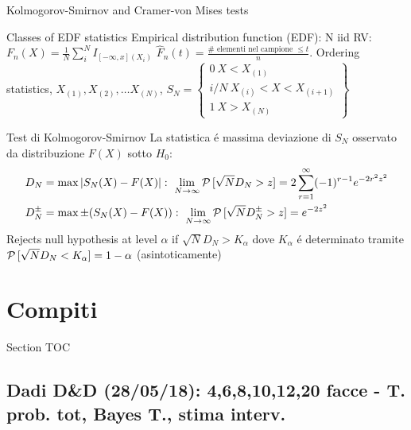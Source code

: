 \documentclass[asd-beamer.tex]{subfiles}
\begin{document}
\begin{frame}{Kolmogorov-Smirnov and Cramer-von Mises tests}
\begin{block}{Classes of EDF statistics}
	Empirical distribution function (EDF): N iid RV: $F_n(X)=\frac{1}{N}\sum_i^NI_{[-\infty,x](X_i)}$ $\hat{F}_n(t)=\frac{\#\text{ elementi nel campione }\leq t}{n}$.
 Ordering statistics, $X_{(1)}, X_{(2)}, \ldots X_{(N)}$, $S_N=\left\{\begin{array}{c}0\ X<X_{(1)}\\i/N\ X_{(i)}<X<X_{(i+1)}\\1\ X>X_{(N)}\end{array}\right\}$
\end{block}

\begin{block}{Test di Kolmogorov-Smirnov }
La statistica \'e massima deviazione di $S_N$ osservato da distribuzione $F(X)$ sotto $H_0$:
\begin{align*}
&D_N=\max|S_N(X)-F(X)|:\ \lim_{N\to\infty}\prob{[\sqrt{N}D_N>z]}=2\sum_{r=1}^{\infty}(-1)\expy{r-1}\exp{-2r^2z^2}\\
&D_N^{\pm}=\max\pm(S_N(X)-F(X)):\ \lim_{N\to\infty}\prob{[\sqrt{N}D_N^{\pm}>z]}=\exp{-2z^2}
\end{align*}
Rejects null hypothesis at level $\alpha$ if $\sqrt{N}D_N>K_{\alpha}$ dove $K_{\alpha}$ \'e determinato tramite $\operatorname{\mathcal{P}}{[\sqrt{N}D_N<K_{\alpha}]}=1-\alpha$ (asintoticamente)
\end{block}
\end{frame}


\section{Compiti}

\begin{frame}[allowframebreaks]{Section TOC}
\tableofcontents[currentsection,sectionstyle=show/hide,subsectionstyle=show/show/hide]
\end{frame}

\subsection{Dadi D\&D (28/05/18): 4,6,8,10,12,20 facce - T. prob. tot, Bayes T., stima interv.}
\end{document}
